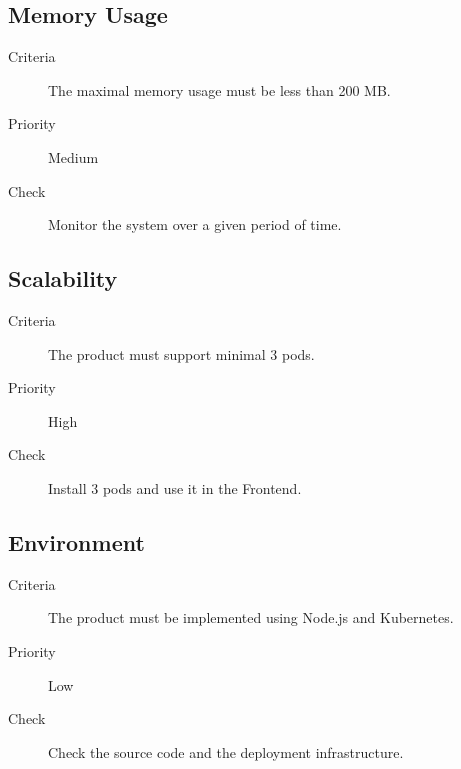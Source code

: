 \subsection{Memory Usage}
\begin{description}
\item[Criteria] The maximal memory usage must be less than 200 MB.
\item[Priority] Medium
\item[Check] Monitor the system over a given period of time.
\end{description}

\subsection{Scalability}
\begin{description}
\item[Criteria] The product must support minimal 3 pods.
\item[Priority] High
\item[Check] Install 3 pods and use it in the Frontend.
\end{description}

\subsection{Environment}
\begin{description}
\item[Criteria] The product must be implemented using Node.js and Kubernetes.
\item[Priority] Low
\item[Check] Check the source code and the deployment infrastructure.
\end{description}